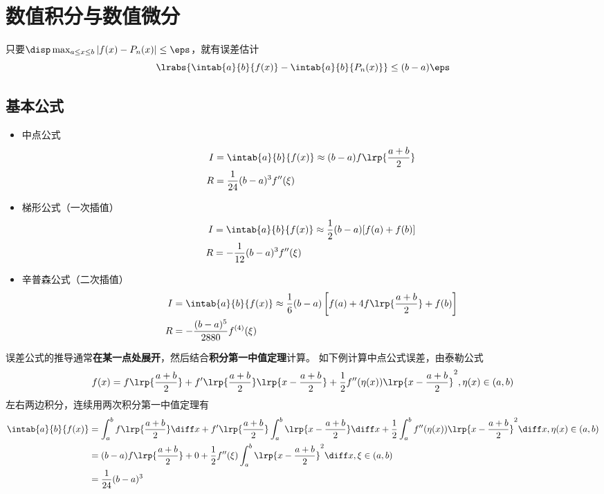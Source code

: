 
\section{数值积分与数值微分}
只要$\disp\max_{a\leq x\leq b}|f(x)-P_n(x)|\leq\eps$，就有误差估计
\[\lrabs{\intab{a}{b}{f(x)}-\intab{a}{b}{P_n(x)}}\leq (b-a)\eps\]

\subsection{基本公式}
\begin{itemize}
\item 中点公式
\[\begin{aligned}
    I&=\intab{a}{b}{f(x)}\approx(b-a)f\lrp{\frac{a+b}{2}}\\
    R&=\frac{1}{24}(b-a)^3f''(\xi)
\end{aligned}\]
\item 梯形公式（一次插值）
\[\begin{aligned}
    I&=\intab{a}{b}{f(x)}\approx\frac{1}{2}(b-a)[f(a)+f(b)]\\
    R&=-\frac{1}{12}(b-a)^3f''(\xi)
\end{aligned}\]
\item 辛普森公式（二次插值）
\[\begin{aligned}
    I&=\intab{a}{b}{f(x)}\approx\frac{1}{6}(b-a)\left[f(a)+4f\lrp{\frac{a+b}{2}}+f(b)\right]\\
    R&=-\frac{(b-a)^5}{2880}f^{(4)}(\xi)
\end{aligned}\]
\end{itemize}
\begin{analysis}
    误差公式的推导通常\textbf{在某一点处展开}，然后结合\textbf{积分第一中值定理}计算。
    如下例计算中点公式误差，由泰勒公式
    \[f(x)=f\lrp{\frac{a+b}{2}}+f'\lrp{\frac{a+b}{2}}\lrp{x-\frac{a+b}{2}}+\frac{1}{2}f''(\eta(x))\lrp{x-\frac{a+b}{2}}^2,\eta(x)\in(a,b)\]
    左右两边积分，连续用两次积分第一中值定理有
    \[\begin{aligned}
        \intab{a}{b}{f(x)}&=\int_a^b f\lrp{\frac{a+b}{2}}\diff x+f'\lrp{\frac{a+b}{2}}\int_a^b\lrp{x-\frac{a+b}{2}}\diff x+\frac{1}{2}\int_a^b f''(\eta(x))\lrp{x-\frac{a+b}{2}}^2\diff x,\eta(x)\in(a,b)\\
        &=(b-a)f\lrp{\frac{a+b}{2}}+0+\frac{1}{2}f''(\xi)\int_a^b \lrp{x-\frac{a+b}{2}}^2\diff x,\xi\in(a,b)\\
        &=\frac{1}{24}(b-a)^3
    \end{aligned}\]
\end{analysis}

